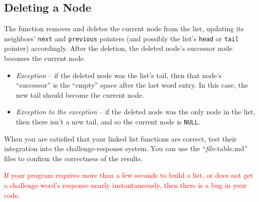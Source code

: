 \subsection{Deleting a Node} \label{subsec:DeletingNode}

The  function removes and deletes the current node from the list, updating its neighbors' \lstinline{next} and \lstinline{previous} pointers (and possibly the list's \lstinline{head} or \lstinline{tail} pointer) accordingly.
After the deletion, the deleted node's successor node becomes the current node.
\begin{itemize}
    \item[] \textit{Exception} -- if the deleted node was the list's tail, then that node's ``successor'' is the ``empty'' space after the last word entry.
        In this case, the new tail should become the current node.
    \item[] \textit{Exception to the exception} -- if the deleted node was the only node in the list, then there isn't a new tail, and so the current node is \lstinline{NULL}.
\end{itemize}

\begin{description}
\end{description}


When you are satisfied that your linked list functions are correct, test their integration into the challenge-response system.
You can use the ``\textit{file}-table.md'' files to confirm the correctness of the results.

\textcolor{red}{If your program requires more than a few seconds to build a list, or does not get a challenge word's response nearly instantaneously, then there is a bug in your code.}

